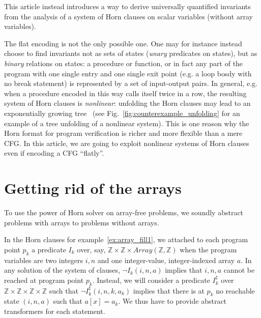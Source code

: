 \documentclass[a4paper]{article}
\newcommand{\ZZ}{\mathbb{Z}}
\newcommand{\arraytype}[2]{\mathit{Array}\left(#1,#2\right)}
\newcommand{\abstr}[1]{#1^\sharp}
\theoremstyle{definition}
\theoremstyle{plain}
\begin{document}
This article instead introduces a way to derive universally quantified invariants from the analysis of a system of Horn clauses on scalar variables (without array variables).


The flat encoding is not the only possible one. One may for instance instead choose to find invariants not as sets of states (\emph{unary} predicates on states), but as \emph{binary} relations on states: a procedure or function, or in fact any part of the program with one single entry and one single exit point (e.g. a loop bosdy with no break statement) is represented by a set of input-output pairs.
In general, e.g. when a procedure encoded in this way calls itself twice in a row, the resulting system of Horn clauses is \emph{nonlinear}: unfolding the Horn clauses may lead to an exponentially growing tree~\cite{DBLP:conf/vstte/RummerHK13} (see Fig.~\ref{fig:counterexample_unfolding} for an example of a tree unfolding of a nonlinear system).
This is one reason why the Horn format for program verification is richer and more flexible than a mere CFG.
In this article, we are going to exploit nonlinear systems of Horn clauses even if encoding a CFG ``flatly''.

\section{Getting rid of the arrays}
\label{sec:abstraction1}
To use the power of Horn solver on array-free problems, we soundly abstract problems with arrays to problems without arrays.

In the Horn clauses for example~\ref{ex:array_fill1}, we attached to each program point $p_k$ a predicate $I_k$ over, say, $\ZZ \times \ZZ \times \arraytype{\ZZ}{\ZZ}$ when the program variables are two integers $i,n$ and one integer-value, integer-indexed array $a$. In any solution of the system of clauses, $\neg I_k(i,n,a)$ implies that $i,n,a$ cannot be reached at program point $p_k$. Instead, we will consider a predicate $\abstr{I}_k$ over $\ZZ \times \ZZ \times \ZZ \times \ZZ$ such that $\neg \abstr{I}_k(i,n,k,a_k)$ implies that there is at $p_k$ no reachable state $(i,n,a)$ such that $a[x]=a_k$. We thus have to provide abstract transformers for each statement.
\end{document}
